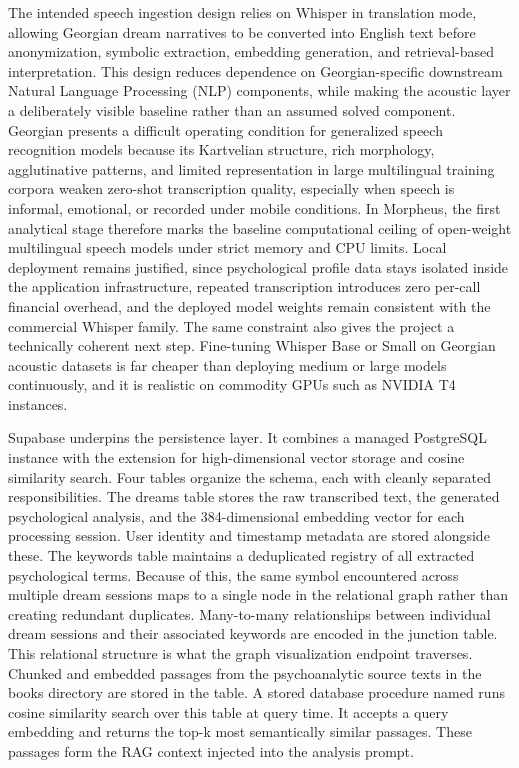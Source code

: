 \documentclass[12pt,a4paper]{report}
\DeclareRobustCommand{\code}[1]{\texttt{\detokenize{#1}}}
\begin{document}
The intended speech ingestion design relies on Whisper in translation mode, allowing Georgian dream narratives to be converted into English text before anonymization, symbolic extraction, embedding generation, and retrieval-based interpretation. This design reduces dependence on Georgian-specific downstream Natural Language Processing (NLP) components, while making the acoustic layer a deliberately visible baseline rather than an assumed solved component. Georgian presents a difficult operating condition for generalized speech recognition models because its Kartvelian structure, rich morphology, agglutinative patterns, and limited representation in large multilingual training corpora weaken zero-shot transcription quality, especially when speech is informal, emotional, or recorded under mobile conditions. In Morpheus, the first analytical stage therefore marks the baseline computational ceiling of open-weight multilingual speech models under strict memory and CPU limits. Local deployment remains justified, since psychological profile data stays isolated inside the application infrastructure, repeated transcription introduces zero per-call financial overhead, and the deployed model weights remain consistent with the commercial Whisper family. The same constraint also gives the project a technically coherent next step. Fine-tuning Whisper Base or Small on Georgian acoustic datasets is far cheaper than deploying medium or large models continuously, and it is realistic on commodity GPUs such as NVIDIA T4 instances.

Supabase underpins the persistence layer. It combines a managed PostgreSQL instance with the \code{pgvector} extension for high-dimensional vector storage and cosine similarity search. Four tables organize the schema, each with cleanly separated responsibilities. The dreams table stores the raw transcribed text, the generated psychological analysis, and the \num{384}-dimensional embedding vector for each processing session. User identity and timestamp metadata are stored alongside these. The keywords table maintains a deduplicated registry of all extracted psychological terms. Because of this, the same symbol encountered across multiple dream sessions maps to a single node in the relational graph rather than creating redundant duplicates. Many-to-many relationships between individual dream sessions and their associated keywords are encoded in the \code{dream_keywords} junction table. This relational structure is what the graph visualization endpoint traverses. Chunked and embedded passages from the psychoanalytic source texts in the books directory are stored in the \code{knowledge_base} table. A stored database procedure named \code{match_documents} runs cosine similarity search over this table at query time. It accepts a query embedding and returns the top-k most semantically similar passages. These passages form the RAG context injected into the analysis prompt.
\end{document}
